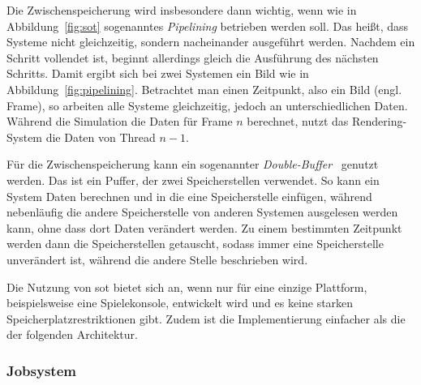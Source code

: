 Die Zwischenspeicherung wird insbesondere dann wichtig, wenn wie in Abbildung~\ref{fig:sot} sogenanntes \emph{Pipelining} betrieben werden soll. Das heißt, dass Systeme nicht gleichzeitig, sondern nacheinander ausgeführt werden. Nachdem ein Schritt vollendet ist, beginnt allerdings gleich die Ausführung des nächsten Schritts. Damit ergibt sich bei zwei Systemen ein Bild wie in Abbildung~\ref{fig:pipelining}. Betrachtet man einen Zeitpunkt, also ein Bild (engl. Frame), so arbeiten alle Systeme gleichzeitig, jedoch an unterschiedlichen Daten. Während die Simulation die Daten für Frame $n$ berechnet, nutzt das Rendering-System die Daten von Thread $n-1$.

Für die Zwischenspeicherung kann ein sogenannter \emph{Double-Buffer}~\cite[S.~143]{Nystrom2015} genutzt werden. Das ist ein Puffer, der zwei Speicherstellen verwendet. So kann ein System Daten berechnen und in die eine Speicherstelle einfügen, während nebenläufig die andere Speicherstelle von anderen Systemen ausgelesen werden kann, ohne dass dort Daten verändert werden. Zu einem bestimmten Zeitpunkt werden dann die Speicherstellen getauscht, sodass immer eine Speicherstelle unverändert ist, während die andere Stelle beschrieben wird.

Die Nutzung von \ac{sot} bietet sich an, wenn nur für eine einzige Plattform, beispielsweise eine Spielekonsole, entwickelt wird und es keine starken Speicherplatzrestriktionen gibt. Zudem ist die Implementierung einfacher als die der folgenden Architektur.

\subsubsection{Jobsystem}\label{sec:gamesJobsystem}

